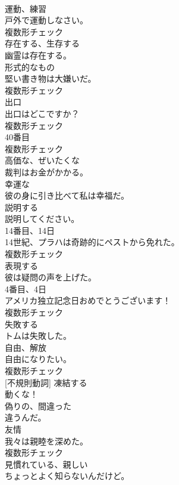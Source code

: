 \documentclass[8pt]{extreport}
\begin{document}
\begin{CJK}{UTF8}{min}
\\	[名詞]	運動、練習	
\\	戸外で運動しなさい。	
\\	複数形チェック
\\	[動詞]	存在する、生存する	
\\	幽霊は存在する。	
\\	[名詞]	形式的なもの	
\\	堅い書き物は大嫌いだ。	
\\	複数形チェック
\\	[名詞]	出口	
\\	出口はどこですか？	
\\	複数形チェック
\\	[名詞]	40番目	
\\	複数形チェック
\\	[形容詞]	高価な、ぜいたくな	
\\	裁判はお金がかかる。	
\\	[形容詞]	幸運な	
\\	彼の身に引き比べて私は幸福だ。	
\\	[動詞]	説明する	
\\	説明してください。	
\\	[名詞]	14番目、14日	
\\	14世紀、プラハは奇跡的にペストから免れた。	
\\	複数形チェック
\\	[動詞]	表現する	
\\	彼は疑問の声を上げた。	
\\	[名詞]	4番目、4日	
\\	アメリカ独立記念日おめでとうございます！	
\\	複数形チェック
\\	[動詞]	失敗する	
\\	トムは失敗した。	
\\	[名詞]	自由、解放	
\\	自由になりたい。	
\\	複数形チェック
\\	[動詞] [不規則動詞]	凍結する	
\\	動くな！	
\\	[形容詞]	偽りの、間違った	
\\	違うんだ。	
\\	[名詞]	友情	
\\	我々は親睦を深めた。	
\\	複数形チェック
\\	[形容詞]	見慣れている、親しい	
\\	ちょっとよく知らないんだけど。	

\end{CJK}
\end{document}
